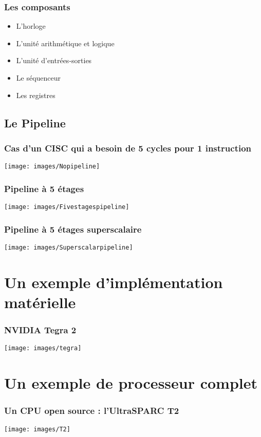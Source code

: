 \documentclass[slidetop,11pt]{beamer}
\begin{document}
        \begin{frame}
            \frametitle{Les composants}
            \begin{itemize}
                \item L'horloge
                \item L'unité arithmétique et logique
                \item L'unité d'entrées-sorties
                \item Le séquenceur
                \item Les registres
            \end{itemize}
        \end{frame}
 
    \subsection[Pipeline]{Le Pipeline}
        \begin{frame}
            \frametitle{Cas d'un CISC qui a besoin de 5 cycles pour 1 instruction}
            \begin{center}
                \texttt{[image: images/Nopipeline]}
            \end{center}
        \end{frame}

        \begin{frame}
            \frametitle{Pipeline à 5 étages}
            \begin{center}
                \texttt{[image: images/Fivestagespipeline]}
            \end{center}
        \end{frame}

        \begin{frame}
            \frametitle{Pipeline à 5 étages superscalaire}
            \begin{center}
                \texttt{[image: images/Superscalarpipeline]}
            \end{center}
        \end{frame}


\section[Hardware]{Un exemple d'implémentation matérielle}
    \begin{frame}
        \frametitle{NVIDIA Tegra 2}
        \begin{center}
            \texttt{[image: images/tegra]}
        \end{center}
    \end{frame}

\section[CPU]{Un exemple de processeur complet}
    \begin{frame}
        \frametitle{Un CPU open source : l'UltraSPARC T2}
        \begin{center}
            \texttt{[image: images/T2]}
        \end{center}
    \end{frame}
\end{document}
